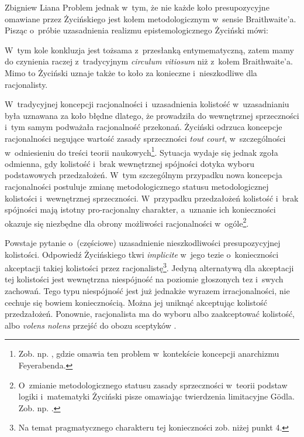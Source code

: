 \begin{artplenv}{Zbigniew Liana}
Problem jednak w~tym, że nie każde koło presupozycyjne omawiane przez Życińskiego jest kołem metodologicznym w~sensie Braith\-waite'a. Pisząc o~próbie uzasadnienia realizmu epistemologicznego Życiński mówi:

W~tym kole konkluzja jest tożsama z~przesłanką entymematyczną, zatem mamy do czynienia raczej z~tradycyjnym \textit{circulum vitiosum} niż z~kołem Braithwaite'a. Mimo to Życiński uznaje także to koło za konieczne i~nieszkodliwe dla racjonalisty.

W~tradycyjnej koncepcji racjonalności i~uzasadnienia kolistość w~uzasadnianiu była uznawana za koło błędne dlatego, że prowadziła do wewnętrznej sprzeczności i~tym samym podważała racjonalność przekonań. Życiński odrzuca koncepcje racjonalności negujące wartość zasady sprzeczności \textit{tout court}, w~szczególności w~odniesieniu do treści teorii naukowych\footnote{Zob. np.
\parencites[][s.~218n]{zycinski_elementy_1996}[][s.~297n]{zycinski_elementy_2015}, %
 gdzie omawia ten problem w~kontekście koncepcji anarchizmu Feyerabenda.}. Sytuacja wydaje się jednak zgoła odmienna, gdy kolistość i~brak wewnętrznej spójności dotyka wyboru podstawowych przedzałożeń. W~tym szczególnym przypadku nowa koncepcja racjonalności postuluje zmianę metodologicznego statusu metodologicznej kolistości i~wewnętrznej sprzeczności. W~przypadku przedzałożeń kolistość i~brak spójności mają istotny pro-racjonalny charakter, a~uznanie ich konieczności okazuje się niezbędne dla obrony możliwości racjonalności w~ogóle\footnote{O~zmianie metodologicznego statusu zasady sprzeczności w~teorii podstaw logiki i~matematyki Życiński pisze omawiając twierdzenia limitacyjne Gödla. Zob. np. 
\parencites[][s.~196]{zycinski_teizm_1985}[][s.~131n]{zycinski_structure_1988}[][s.~231nn]{zycinski_struktura_2013_liana}[][s.~266n]{zycinski_elementy_1996}[][s.~360nn]{zycinski_elementy_2015}.%
}.

Powstaje pytanie o~(częściowe) uzasadnienie nieszkodliwości presupozycyjnej kolistości. Odpowiedź Życińskiego tkwi \textit{implicite} w~jego tezie o~konieczności akceptacji takiej kolistości przez racjonalistę\footnote{Na temat pragmatycznego charakteru tej konieczności zob. niżej punkt 4.}. Jedyną alternatywą dla akceptacji tej kolistości jest wewnętrzna niespójność na poziomie głoszonych tez i~swych zachowań. Tego typu niespójność jest już jednakże wyrazem irracjonalności, nie cechuje się bowiem koniecznością. Można jej uniknąć akceptując kolistość przedzałożeń. Ponownie, racjonalista ma do wyboru albo zaakceptować kolistość, albo \textit{volens nolens} przejść do obozu sceptyków
\parencite[][s.~165]{zycinski_teizm_1985}.%



\end{artplenv}
